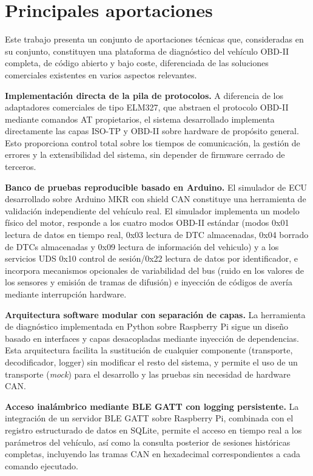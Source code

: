 \section{Principales aportaciones}

Este trabajo presenta un conjunto de aportaciones técnicas que, consideradas en su conjunto, constituyen una plataforma de diagnóstico del vehículo OBD-II completa, de código abierto y bajo coste, diferenciada de las soluciones comerciales existentes en varios aspectos relevantes.

\textbf{Implementación directa de la pila de protocolos.} A diferencia de los adaptadores comerciales de tipo ELM327, que abstraen el protocolo OBD-II mediante comandos AT propietarios, el sistema desarrollado implementa directamente las capas ISO-TP y OBD-II sobre hardware de propósito general. Esto proporciona control total sobre los tiempos de comunicación, la gestión de errores y la extensibilidad del sistema, sin depender de firmware cerrado de terceros.

\textbf{Banco de pruebas reproducible basado en Arduino.} El simulador de ECU desarrollado sobre Arduino MKR con shield CAN constituye una herramienta de validación independiente del vehículo real. El simulador implementa un modelo físico del motor, responde a los cuatro modos OBD-II estándar (modos 0x01 lectura de datos en tiempo real, 0x03 lectura de DTC almacenadas, 0x04 borrado de DTCs almacenadas y 0x09 lectura de información del vehiculo) y a los servicios UDS 0x10 control de sesión/0x22 lectura de datos por identificador, e incorpora mecanismos opcionales de variabilidad del bus (ruido en los valores de los sensores y emisión de tramas de difusión) e inyección de códigos de avería mediante interrupción hardware.

\textbf{Arquitectura software modular con separación de capas.} La herramienta de diagnóstico implementada en Python sobre Raspberry Pi sigue un diseño basado en interfaces y capas desacopladas mediante inyección de dependencias. Esta arquitectura facilita la sustitución de cualquier componente (transporte, decodificador, logger) sin modificar el resto del sistema, y permite el uso de un transporte  (\textit{mock}) para el desarrollo y las pruebas sin necesidad de hardware CAN.

\textbf{Acceso inalámbrico mediante BLE GATT con logging persistente.} La integración de un servidor BLE GATT sobre Raspberry Pi, combinada con el registro estructurado de datos en SQLite, permite el acceso en tiempo real a los parámetros del vehículo, así como la consulta posterior de sesiones históricas completas, incluyendo las tramas CAN en hexadecimal correspondientes a cada comando ejecutado.

